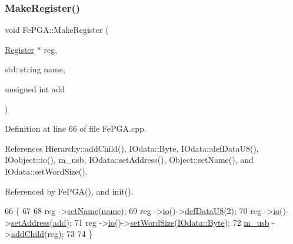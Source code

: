 \subsubsection{\texorpdfstring{Make\+Register()}{MakeRegister()}}
{\footnotesize\ttfamily void Fe\+P\+G\+A\+::\+Make\+Register (\begin{DoxyParamCaption}\item[{\hyperlink{classRegister}{Register} $\ast$}]{reg,  }\item[{std\+::string}]{name,  }\item[{unsigned int}]{add }\end{DoxyParamCaption})}



Definition at line 66 of file Fe\+P\+G\+A.\+cpp.



References Hierarchy\+::add\+Child(), I\+Odata\+::\+Byte, I\+Odata\+::def\+Data\+U8(), I\+Oobject\+::io(), m\+\_\+usb, I\+Odata\+::set\+Address(), Object\+::set\+Name(), and I\+Odata\+::set\+Word\+Size().



Referenced by Fe\+P\+G\+A(), and init().


\begin{DoxyCode}
66                                                                        \{
67 
68   reg   ->\hyperlink{classObject_ae30fea75683c2d149b6b6d17c09ecd0c}{setName}(\hyperlink{classObject_a300f4c05dd468c7bb8b3c968868443c1}{name});
69   reg   ->\hyperlink{classIOobject_af04fb94137c3d86849f478ac5afab5d1}{io}()->\hyperlink{classIOdata_a80bb230b61062b447db5832e43bf7b44}{defDataU8}(2);     
70   reg   ->\hyperlink{classIOobject_af04fb94137c3d86849f478ac5afab5d1}{io}()->\hyperlink{classIOdata_af98cbfbc28346ebb9b64ca0203af1463}{setAddress}(\hyperlink{classAttrib_a235f773af19c900264a190b00a3b4ad7}{add});
71   reg   ->\hyperlink{classIOobject_af04fb94137c3d86849f478ac5afab5d1}{io}()->\hyperlink{classIOdata_a20f30a9f4673713616447b1b5e9817d5}{setWordSize}(\hyperlink{classIOdata_a37c53ebf4bf8d866aac8af572962a84ca00156611f08eeb1b5d361de809dafb8e}{IOdata::Byte});
72   \hyperlink{classFePGA_afb7947e600a66d914ee524acec3d8b1f}{m\_usb} ->\hyperlink{classHierarchy_ad677774ff38fcb257c04a3a10d471fac}{addChild}(reg);
73 
74 \}
\end{DoxyCode}
\mbox{\label{classFePGA_a2bcd2c468fc3e1bcadc9bd8800b325a0}} 
